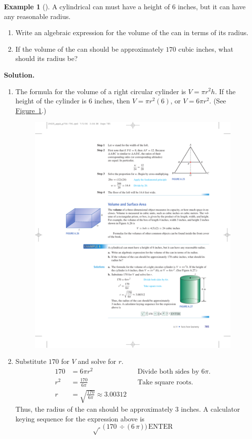 \documentclass[10pt,]{book}
\theoremstyle{plain}
\theoremstyle{definition}
\theoremstyle{definition}
\newtheorem{example}[theorem]{Example}
\theoremstyle{definition}
\numberwithin{equation}{part}
\newcommand{\amp}{&}
\begin{document}
\begin{example}[]\label{example-84}
A cylindrical can must have a height of \(6\) inches, but it can have any reasonable radius. \leavevmode%
\begin{enumerate}[label=*\alph**]
\item\hypertarget{li-374}{}Write an algebraic expression for the volume of the can in terms of its radius.%
\item\hypertarget{li-375}{}If the volume of the can should be approximately \(170\) cubic inches, what should its radius be?%
\end{enumerate}
%
\par\medskip\noindent%
\textbf{Solution.}\quad \leavevmode%
\begin{enumerate}[label=*\alph**]
\item\hypertarget{li-376}{}The formula for the volume of a right circular cylinder is \(V = \pi r^2h\). If the height of the cylinder is \(6\) inches, then \(V = \pi r^2 (6)\), or \(V = 6\pi r^2\). (See \hyperref[fig-cylinder]{Figure~\ref{fig-cylinder}}.) \leavevmode%
\begin{figure}
\centering
\includegraphics[width=0.3\linewidth]{images/fig-cylinder}
\caption{\label{fig-cylinder}}
\end{figure}
%
\item\hypertarget{li-377}{}Substitute \(170\) for \(V\) and solve for \(r\).%
\begin{align*}
170 \amp = 6\pi r^2\amp\amp\text{Divide both sides by }6\pi.
\\
r^2 \amp = \frac{170}{6\pi} \amp\amp\text{Take square roots.}
\\
r \amp = \sqrt{\frac{170}{6\pi}}\approx 3.00312
\end{align*}
Thus, the radius of the can should be approximately \(3\) inches. A calculator keying sequence for the expression above is%
\begin{equation*}
\boxed{\sqrt{~}} \,\boxed{(} \, 170 \, \boxed{\div} \, \boxed{(} \, 6 \, \boxed{\pi} \, \boxed{)}  \, \boxed{)} \, \boxed{\text{ENTER}} 
\end{equation*}
%
\end{enumerate}
%
\end{example}
\end{document}
